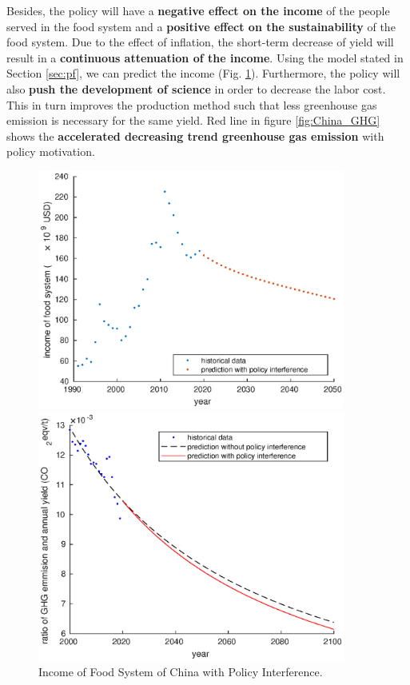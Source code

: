 \documentclass[12pt]{article}
\begin{document}
Besides, the policy will have a \textbf{negative effect on the income} of the people served in the food system and a \textbf{positive effect on the sustainability} of the food system. Due to the effect of inflation, the short-term decrease of yield will result in a \textbf{continuous attenuation of the income}. Using the model stated in Section \ref{sec:pf}, we can predict the income (Fig. \ref{fig:China_income}). Furthermore, the policy will also \textbf{push the development of science} in order to decrease the labor cost. This in turn improves the production method such that less greenhouse gas emission is necessary for the same yield. Red line in figure \ref{fig:China_GHG} shows the \textbf{accelerated decreasing trend greenhouse gas emission} with policy motivation. 
\begin{figure}[H]
    \centering
    \begin{minipage}[t]{0.48\textwidth}
        \centering
        \includegraphics[width=0.9\textwidth]{figure/model/China/China_profit.eps}
        \caption{Income of Food System of China with Policy Interference.\label{fig:China_income}}
    \end{minipage}
    \begin{minipage}[t]{0.48\textwidth}
        \centering
        \includegraphics[width=0.9\textwidth]{figure/model/China/China_sustainability.eps}

\end{minipage}
\end{figure}
\end{document}

